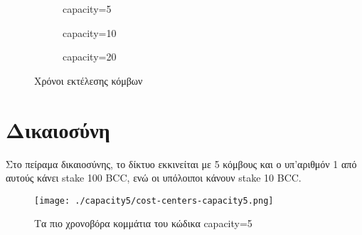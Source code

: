 \documentclass{article}
\newcommand{\eng}[1]{\foreignlanguage{english}{#1}} %
\begin{document}
\begin{figure}[ht]
    \begin{subfigure}{\textwidth}
        \centering
        \caption{\eng{capacity=5}}
        \label{fig:scalability-times-5}
        \begin{varwidth}{\linewidth}
            
        \end{varwidth}
    \end{subfigure}
    \begin{subfigure}{\textwidth}
        \centering
        \caption{\eng{capacity=10}}
        \label{fig:scalability-times-10}
        \begin{varwidth}{\linewidth}
            
        \end{varwidth}
    \end{subfigure}
    \begin{subfigure}{\textwidth}
        \centering
        \caption{\eng{capacity=20}}
        \label{fig:scalability-times-20}
        \begin{varwidth}{\linewidth}
            
        \end{varwidth}
    \end{subfigure}
    \caption{Χρόνοι εκτέλεσης κόμβων}
    \label{fig:scalability-times}
\end{figure}
\FloatBarrier


\clearpage
\section{Δικαιοσύνη}

Στο πείραμα δικαιοσύνης, το δίκτυο εκκινείται με 5 κόμβους και ο υπ'αριθμόν 1
από αυτούς κάνει \eng{stake 100 BCC}, ενώ οι υπόλοιποι κάνουν \eng{stake 10 BCC}.

\graphicspath{{../experiments/profiled\_outputs/fairness_proper/}}
\begin{figure}[ht]
    \centering
    \texttt{[image: ./capacity5/cost-centers-capacity5.png]}
    \caption{Τα πιο χρονοβόρα κομμάτια του κώδικα \eng{capacity=5}}
    \label{fig:fairness-cost-centers}
\end{figure}
\end{document}
